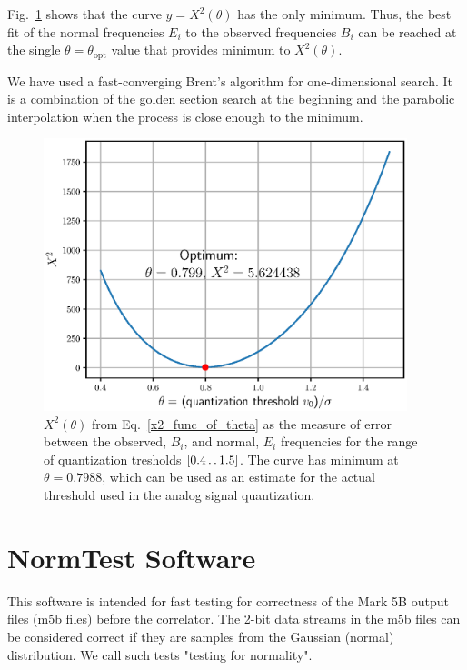 \documentclass[letterpaper,twoside,12pt]{article}
\begin{document}
Fig.~\ref{optimum_theta} shows that the curve $y = X^2(\theta)$ has the only minimum. Thus, the best fit of the normal frequencies $E_i$ to the observed frequencies $B_i$ can be reached at the single $\theta=\theta_\text{opt}$ value that provides minimum to $X^2(\theta)$. 

We have used a fast-converging Brent's algorithm for one-dimensional search. It is a combination of the golden section search at the beginning and the parabolic interpolation when the process is close enough to the minimum.


\begin{figure}[ht!]
  \begin{center}
  \includegraphics[width=25pc]{fig_optimal_quantization_threshold.eps}
  \caption{\small $X^2(\theta)$ from Eq.~\eqref{x2_func_of_theta} as the measure of error between the observed, $B_i$, and normal, $E_i$ frequencies for the range of quantization tresholds $[0.4 \mathinner{\ldotp\ldotp}1.5]$. The curve has minimum at $\theta = 0.7988$, which can be used as an estimate for the actual threshold used in the analog signal quantization.}
  \label{optimum_theta}
  \end{center}
\end{figure}



\section{NormTest Software}

This software is intended for fast testing for correctness of the Mark 5B output
files (m5b files) before the correlator. The 2-bit data streams in the m5b files
can be considered correct if they are samples from the Gaussian (normal)
distribution. We call such tests "testing for normality".
\end{document}
